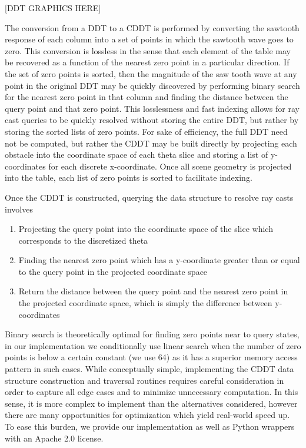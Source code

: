 \documentclass[letterpaper, 10 pt, conference]{ieeeconf}  %
\begin{document}
[DDT GRAPHICS HERE]

The conversion from a DDT to a CDDT is performed by converting the sawtooth response of each column into a set of points in which the sawtooth wave goes to zero. This conversion is lossless in the sense that each element of the table may be recovered as a function of the nearest zero point in a particular direction. If the set of zero points is sorted, then the magnitude of the saw tooth wave at any point in the original DDT may be quickly discovered by performing binary search for the nearest zero point in that column and finding the distance between the query point and that zero point. This losslessness and fast indexing allows for ray cast queries to be quickly resolved without storing the entire DDT, but rather by storing the sorted lists of zero points.
For sake of efficiency, the full DDT need not be computed, but rather the CDDT may be built directly by projecting each obstacle into the coordinate space of each theta slice and storing a list of y-coordinates for each discrete x-coordinate. Once all scene geometry is projected into the table, each list of zero points is sorted to facilitate indexing.

Once the CDDT is constructed, querying the data structure to resolve ray casts involves

\begin{enumerate}
    \item Projecting the query point into the coordinate space of the slice which corresponds to the discretized theta
    \item Finding the nearest zero point which has a y-coordinate greater than or equal to the query point in the projected coordinate space
    \item Return the distance between the query point and the nearest zero point in the projected coordinate space, which is simply the difference between y-coordinates
\end{enumerate}

Binary search is theoretically optimal for finding zero points near to query states, in our implementation we conditionally use linear search when the number of zero points is below a certain constant (we use 64) as it has a superior memory access pattern in such cases.
While conceptually simple, implementing the CDDT data structure construction and traversal routines requires careful consideration in order to capture all edge cases and to minimize unnecessary computation. In this sense, it is more complex to implement than the alternatives considered, however there are many opportunities for optimization which yield real-world speed up. To ease this burden, we provide our implementation as well as Python wrappers with an Apache 2.0 license.
\end{document}
